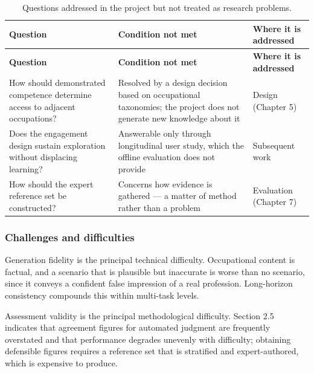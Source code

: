 {\small{}\renewcommand{\arraystretch}{1.1}
\begin{longtable}{|>{\raggedright\arraybackslash}p{}|>{\raggedright\arraybackslash}p{}|>{\raggedright\arraybackslash}p{}|}
\caption{Questions addressed in the project but not treated as research problems.} \\
\hline
\textbf{Question} & \textbf{Condition not met} & \textbf{Where it is addressed} \\ \hline
\endfirsthead
\hline
\textbf{Question} & \textbf{Condition not met} & \textbf{Where it is addressed} \\ \hline
\endhead
How should demonstrated competence determine access to adjacent occupations? & Resolved by a design decision based on occupational taxonomies; the project does not generate new knowledge about it & Design (Chapter 5) \\ \hline
Does the engagement design sustain exploration without displacing learning? & Answerable only through longitudinal user study, which the offline evaluation does not provide & Subsequent work \\ \hline
How should the expert reference set be constructed? & Concerns how evidence is gathered --- a matter of method rather than a problem & Evaluation (Chapter 7) \\ \hline
\end{longtable}
}

\subsubsection{Challenges and difficulties}

Generation fidelity is the principal technical difficulty. Occupational content is factual, and a scenario that is plausible but inaccurate is worse than no scenario, since it conveys a confident false impression of a real profession. Long-\allowbreak{}horizon consistency compounds this within multi-task levels.

Assessment validity is the principal methodological difficulty. Section 2.5 indicates that agreement figures for automated judgment are frequently overstated and that performance degrades unevenly with difficulty; obtaining defensible figures requires a reference set that is stratified and expert-\allowbreak{}authored, which is expensive to produce.

